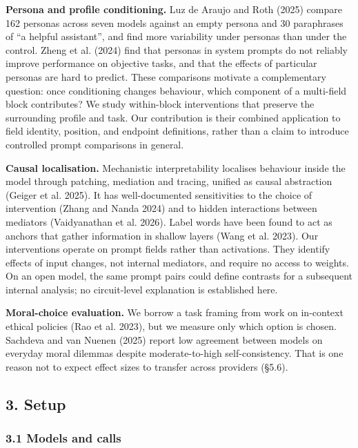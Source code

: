 \documentclass[
  11pt]{article}
\begin{document}
\textbf{Persona and profile conditioning.} Luz de Araujo and Roth (2025)
compare 162 personas across seven models against an empty persona and 30
paraphrases of ``a helpful assistant'', and find more variability under
personas than under the control. Zheng et al. (2024) find that personas
in system prompts do not reliably improve performance on objective
tasks, and that the effects of particular personas are hard to predict.
These comparisons motivate a complementary question: once conditioning
changes behaviour, which component of a multi-field block contributes?
We study within-block interventions that preserve the surrounding
profile and task. Our contribution is their combined application to
field identity, position, and endpoint definitions, rather than a claim
to introduce controlled prompt comparisons in general.

\textbf{Causal localisation.} Mechanistic interpretability localises
behaviour inside the model through patching, mediation and tracing,
unified as causal abstraction (Geiger et al. 2025). It has
well-documented sensitivities to the choice of intervention (Zhang and
Nanda 2024) and to hidden interactions between mediators (Vaidyanathan
et al. 2026). Label words have been found to act as anchors that gather
information in shallow layers (Wang et al. 2023). Our interventions
operate on prompt fields rather than activations. They identify effects
of input changes, not internal mediators, and require no access to
weights. On an open model, the same prompt pairs could define contrasts
for a subsequent internal analysis; no circuit-level explanation is
established here.

\textbf{Moral-choice evaluation.} We borrow a task framing from work on
in-context ethical policies (Rao et al. 2023), but we measure only which
option is chosen. Sachdeva and van Nuenen (2025) report low agreement
between models on everyday moral dilemmas despite moderate-to-high
self-consistency. That is one reason not to expect effect sizes to
transfer across providers (§5.6).

\subsection{3. Setup}\label{setup}

\subsubsection{3.1 Models and calls}\label{models-and-calls}
\end{document}
